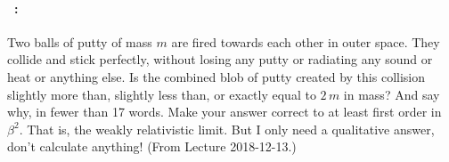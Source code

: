 \documentclass[12pt]{article} 
\begin{document}
\vfill

\paragraph{\problemname~\theproblem:}%
Two balls of putty of mass $m$ are fired towards each other in outer space.
They collide and stick perfectly, without losing any putty or
radiating any sound or heat or anything else. Is the combined blob
of putty created by this collision slightly more than, slightly less
than, or exactly equal to $2\,m$ in mass? And say why, in fewer than
17 words. Make your answer correct to at least first order in
$\beta^2$. That is, the weakly relativistic limit. But I only need
a qualitative answer, don't calculate anything! (From Lecture
2018-12-13.)

\vfill
~
\end{document}
